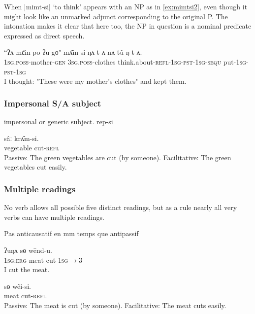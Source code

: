 \documentclass[twoside,a4paper,11pt]{article}
\newcommand{\ipa}[1]{{\phon#1}}
\begin{document}
When |\ipa{mimt-si}| `to think' appears with an NP as in  \ref{ex:mimtsi2}, even though it might look like an unmarked adjunct corresponding to the original P. The intonation makes it clear that here too, the NP in question is a nominal predicate expressed as direct speech.

\begin{exe}
\ex \label{ex:mimtsi2}
\gll 
``\ipa{ʔʌ-mɛ̂m-po} 	\ipa{ʔu-gɵ}" 	\ipa{mʌ̄m-si-ŋʌ-t-ʌ-nʌ} 	\ipa{tû-ŋ-t-ʌ.}
 \\
 \textsc{1sg.poss}-mother-\textsc{gen} \textsc{3sg.poss}-clothes think.about-\textsc{refl-1sg-pst-1sg-sequ} put-\textsc{1sg-pst-1sg} \\
\glt I thought: "These were my mother's clothes" and kept them.
\end{exe}
 
 
 
   \subsubsection{Impersonal S/A subject} 
  impersonal or generic subject. 
   rep-si
   
   \begin{exe}
\ex \label{ex:kriptsi} 
\gll 
 \ipa{sâː}  	\ipa{krʌ̂m-si.}  \\
 vegetable cut-\textsc{refl} \\
\glt Passive: The green vegetables are cut (by someone).
\glt Facilitative: The green vegetables cut easily.
\end{exe}
 
 
 \subsubsection{Multiple readings}  
No verb allows all possible five distinct readings, but as a rule nearly all very verbs can have multiple readings. 

Pas anticausatif en mm temps que antipassif



\begin{exe}
\ex \label{ex:wendu} 
\gll 
\ipa{ʔuŋʌ}  	\ipa{sɵ}  	\ipa{wēnd-u.}  \\
\textsc{1sg:erg} meat cut-\textsc{1sg$\rightarrow$3} \\
\glt I cut the meat.
\end{exe}

\begin{exe}
\ex \label{ex:weisi} 
\gll 
 \ipa{sɵ}  	\ipa{wêi-si.}  \\
 meat cut-\textsc{refl} \\
\glt Passive: The meat is cut (by someone).
\glt Facilitative: The meat cuts easily.
\end{exe}
\end{document}

